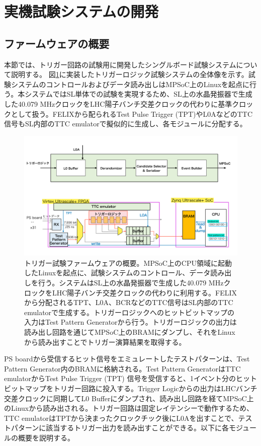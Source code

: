 \section{実機試験システムの開発}
\subsection*{ファームウェアの概要}
本節では、トリガー回路の試験用に開発したシングルボード試験システムについて説明する。
図\ref{TestSystem_Overview}に実装したトリガーロジック試験システムの全体像を示す。試験システムのコントロールおよびデータ読み出しはMPSoC上のLinuxを起点に行う。本システムではSL単体での試験を実現するため、SL上の水晶発振器で生成した40.079 MHzクロックをLHC陽子バンチ交差クロックの代わりに基準クロックとして扱う。FELIXから配られるTest Pulse Trigger (TPT)やL0AなどのTTC信号もSL内部のTTC emulatorで擬似的に生成し、各モジュールに分配する。

\begin{figure} 
\centering
\includegraphics[width=16cm]{fig/Test/TestSystem_overview.pdf}
\caption[トリガー試験ファームウェアの概要]{トリガー試験ファームウェアの概要。MPSoC上のCPU領域に起動したLinuxを起点に、試験システムのコントロール、データ読み出しを行う。システムはSL上の水晶発振器で生成した40.079 MHzクロックをLHC陽子バンチ交差クロックの代わりに利用する。FELIXから分配されるTPT、L0A、BCRなどのTTC信号はSL内部のTTC emulatorで生成する。トリガーロジックへのヒットビットマップの入力はTest Pattern Generatorから行う。トリガーロジックの出力は読み出し回路を通じてMPSoC上のBRAMにダンプし、それをLinuxから読み出すことでトリガー演算結果を取得する。}
\label{TestSystem_Overview}
\end{figure}

PS boardから受信するヒット信号をエミュレートしたテストパターンは、Test Pattern Generator内のBRAMに格納される。Test Pattern GeneratorはTTC emulatorからTest Pulse Trigger (TPT) 信号を受信すると、1イベント分のヒットビットマップをトリガー回路に投入する。Trigger Logicからの出力はLHCバンチ交差クロックに同期してL0 Bufferにダンプされ、読み出し回路を経てMPSoC上のLinuxから読み出される。トリガー回路は固定レイテンシーで動作するため、TTC emulatorはTPTから決まったクロックチック後にL0Aを出すことで、テストパターンに該当するトリガー出力を読み出すことができる。以下に各モジュールの概要を説明する。

